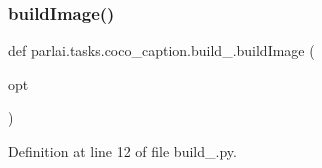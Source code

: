 \subsubsection{\texorpdfstring{build\+Image()}{buildImage()}}
{\footnotesize\ttfamily def parlai.\+tasks.\+coco\+\_\+caption.\+build\+\_.\+build\+Image (\begin{DoxyParamCaption}\item[{}]{opt }\end{DoxyParamCaption})}



Definition at line 12 of file build\+\_.\+py.

